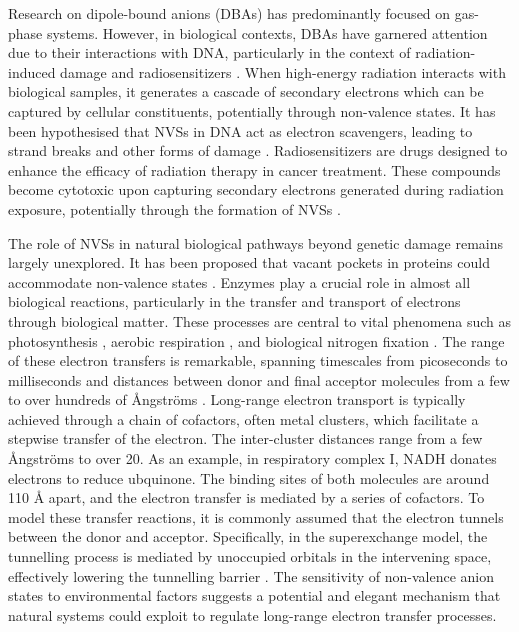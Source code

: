 Research on dipole-bound anions (DBAs) has predominantly focused on gas-phase systems. However, in biological contexts, DBAs have garnered attention due to their interactions with DNA, particularly in the context of radiation-induced damage and radiosensitizers \cite{gu2012interactions,narayanan2023secondary,sedmidubska2024interaction}.
When high-energy radiation interacts with biological samples, it generates a cascade of secondary electrons which can be captured by cellular constituents, potentially through non-valence states. It has been hypothesised that NVSs in DNA act as electron scavengers, leading to strand breaks and other forms of damage \cite{gu2012interactions,narayanan2023secondary,narayanan2024electron,sommerfeld2005dipole}.
Radiosensitizers are drugs designed to enhance the efficacy of radiation therapy in cancer treatment. These compounds become cytotoxic upon capturing secondary electrons generated during radiation exposure, potentially through the formation of NVSs \cite{sedmidubska2024interaction}.

The role of NVSs in natural biological pathways beyond genetic damage remains largely unexplored. It has been proposed that vacant pockets in proteins could accommodate non-valence states \cite{castellani2019stability}. Enzymes play a crucial role in almost all biological reactions, particularly in the transfer and transport of electrons through biological matter. These processes are central to vital phenomena such as photosynthesis \cite{mitchell1961coupling}, aerobic respiration \cite{wikstrom1977proton}, and biological nitrogen fixation \cite{rutledge2020electron}. The range of these electron transfers is remarkable, spanning timescales from picoseconds to milliseconds and distances between donor and final acceptor molecules from a few to over hundreds of \r{A}ngstr{\"o}ms \cite{gray1996electron,blumberger2015recent}. Long-range electron transport is typically achieved through a chain of cofactors, often metal clusters, which facilitate a stepwise transfer of the electron. The inter-cluster distances range from a few \r{A}ngstr{\"o}ms to over 20. As an example, in respiratory complex I, NADH donates electrons to reduce ubquinone\cite{ernster1995biochemical}. The binding sites of both molecules are around 110 \r{A} apart, and the electron transfer is mediated by a series of cofactors. To model these transfer reactions, it is commonly assumed that the electron tunnels between the donor and acceptor. Specifically, in the superexchange model, the tunnelling process is mediated by unoccupied orbitals in the intervening space, effectively lowering the tunnelling barrier \cite{blumberger2015recent}. The sensitivity of non-valence anion states to environmental factors suggests a potential and elegant mechanism that natural systems could exploit to regulate long-range electron transfer processes. %

